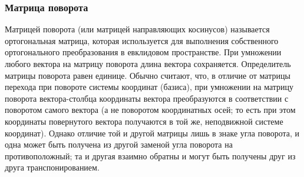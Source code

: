 \subsubsection{Матрица поворота}
Матрицей поворота (или матрицей направляющих косинусов) называется ортогональная матрица,
которая используется для выполнения собственного ортогонального преобразования в евклидовом пространстве.
При умножении любого вектора на матрицу поворота длина вектора сохраняется. Определитель матрицы поворота равен единице.
Обычно считают, что, в отличие от матрицы перехода при повороте системы координат (базиса),
при умножении на матрицу поворота вектора-столбца координаты вектора преобразуются в соответствии с поворотом
самого вектора (а не поворотом координатных осей; то есть при этом координаты повернутого вектора получаются в той же,
неподвижной системе координат). Однако отличие той и другой матрицы лишь в знаке угла поворота,
и одна может быть получена из другой заменой угла поворота на противоположный; та и другая взаимно обратны и могут быть получены
друг из друга транспонированием.

